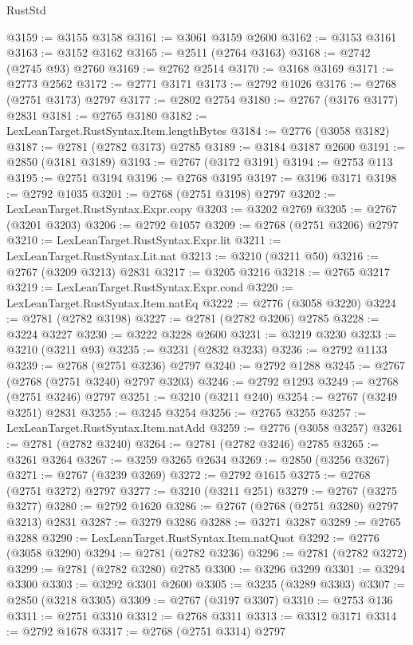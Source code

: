 \begin{lexlean}{RustStd}
\begin{coremodule}
@3159 := @3155 @3158
@3161 := @3061 @3159 @2600
@3162 := @3153 @3161
@3163 := @3152 @3162
@3165 := @2511 (@2764 @3163)
@3168 := @2742 (@2745 @93) @2760
@3169 := @2762 @2514
@3170 := @3168 @3169
@3171 := @2773 @2562
@3172 := @2771 @3171
@3173 := @2792 @1026
@3176 := @2768 (@2751 @3173) @2797
@3177 := @2802 @2754
@3180 := @2767 (@3176 @3177) @2831
@3181 := @2765 @3180
@3182 := LexLeanTarget.RustSyntax.Item.lengthBytes
@3184 := @2776 (@3058 @3182)
@3187 := @2781 (@2782 @3173) @2785
@3189 := @3184 @3187 @2600
@3191 := @2850 (@3181 @3189)
@3193 := @2767 (@3172 @3191)
@3194 := @2753 @113
@3195 := @2751 @3194
@3196 := @2768 @3195
@3197 := @3196 @3171
@3198 := @2792 @1035
@3201 := @2768 (@2751 @3198) @2797
@3202 := LexLeanTarget.RustSyntax.Expr.copy
@3203 := @3202 @2769
@3205 := @2767 (@3201 @3203)
@3206 := @2792 @1057
@3209 := @2768 (@2751 @3206) @2797
@3210 := LexLeanTarget.RustSyntax.Expr.lit
@3211 := LexLeanTarget.RustSyntax.Lit.nat
@3213 := @3210 (@3211 @50)
@3216 := @2767 (@3209 @3213) @2831
@3217 := @3205 @3216
@3218 := @2765 @3217
@3219 := LexLeanTarget.RustSyntax.Expr.cond
@3220 := LexLeanTarget.RustSyntax.Item.natEq
@3222 := @2776 (@3058 @3220)
@3224 := @2781 (@2782 @3198)
@3227 := @2781 (@2782 @3206) @2785
@3228 := @3224 @3227
@3230 := @3222 @3228 @2600
@3231 := @3219 @3230
@3233 := @3210 (@3211 @93)
@3235 := @3231 (@2832 @3233)
@3236 := @2792 @1133
@3239 := @2768 (@2751 @3236) @2797
@3240 := @2792 @1288
@3245 := @2767 (@2768 (@2751 @3240) @2797 @3203)
@3246 := @2792 @1293
@3249 := @2768 (@2751 @3246) @2797
@3251 := @3210 (@3211 @240)
@3254 := @2767 (@3249 @3251) @2831
@3255 := @3245 @3254
@3256 := @2765 @3255
@3257 := LexLeanTarget.RustSyntax.Item.natAdd
@3259 := @2776 (@3058 @3257)
@3261 := @2781 (@2782 @3240)
@3264 := @2781 (@2782 @3246) @2785
@3265 := @3261 @3264
@3267 := @3259 @3265 @2634
@3269 := @2850 (@3256 @3267)
@3271 := @2767 (@3239 @3269)
@3272 := @2792 @1615
@3275 := @2768 (@2751 @3272) @2797
@3277 := @3210 (@3211 @251)
@3279 := @2767 (@3275 @3277)
@3280 := @2792 @1620
@3286 := @2767 (@2768 (@2751 @3280) @2797 @3213) @2831
@3287 := @3279 @3286
@3288 := @3271 @3287
@3289 := @2765 @3288
@3290 := LexLeanTarget.RustSyntax.Item.natQuot
@3292 := @2776 (@3058 @3290)
@3294 := @2781 (@2782 @3236)
@3296 := @2781 (@2782 @3272)
@3299 := @2781 (@2782 @3280) @2785
@3300 := @3296 @3299
@3301 := @3294 @3300
@3303 := @3292 @3301 @2600
@3305 := @3235 (@3289 @3303)
@3307 := @2850 (@3218 @3305)
@3309 := @2767 (@3197 @3307)
@3310 := @2753 @136
@3311 := @2751 @3310
@3312 := @2768 @3311
@3313 := @3312 @3171
@3314 := @2792 @1678
@3317 := @2768 (@2751 @3314) @2797

\end{coremodule}
\end{lexlean}

